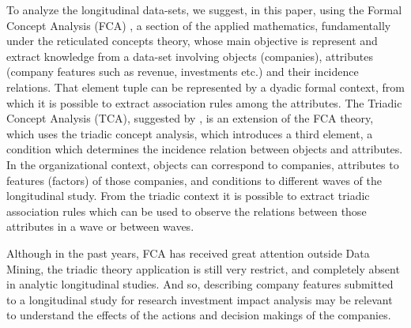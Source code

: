 \documentclass[a4paper,twoside]{article}
\begin{document}
To analyze the longitudinal data-sets, we suggest, in this paper, using the Formal Concept Analysis (FCA) \cite{ganter2012formal}, a section of the applied mathematics, fundamentally under the reticulated concepts theory, whose main objective is represent and extract knowledge from a data-set involving objects (companies), attributes (company features such as revenue, investments etc.) and their incidence relations. That element tuple can be represented by a dyadic formal context, from which it is possible to extract association rules among the attributes. The Triadic Concept Analysis (TCA), suggested by \cite{lehmann:95}, is an extension of the FCA theory, which uses the triadic concept analysis, which introduces a third element, a condition which determines the incidence relation between objects and attributes. In the organizational context, objects can correspond to companies, attributes to features (factors) of those companies, and conditions to different waves of the longitudinal study. From the triadic context it is possible to extract triadic association rules which can be used to observe the relations between those attributes in a wave or between waves.

Although in the past years, FCA has received great attention outside Data Mining, the triadic theory application is still very restrict, and completely absent in analytic longitudinal studies. And so, describing company features submitted to a longitudinal study for research investment impact analysis may be relevant to understand the effects of the actions and decision makings of the companies.
\end{document}
